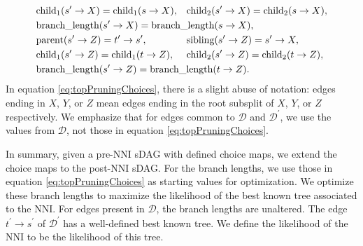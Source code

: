 \documentclass{article}
\begin{document}
\begin{align}
&\text{child}_1 (s^\prime\rightarrow X) = \text{child}_1(s \rightarrow X),&
&\text{child}_2 (s^\prime\rightarrow X) = \text{child}_2(s \rightarrow X),\\\nonumber
&\text{branch\_length} (s^\prime\rightarrow X) = \text{branch\_length}(s \rightarrow X),\hspace{-10em}&&\\\nonumber
&\text{parent} (s^\prime\rightarrow Z) = t^\prime \rightarrow s^\prime,&
&\text{sibling} (s^\prime\rightarrow Z) = s^\prime \rightarrow X,\\\nonumber 
&\text{child}_1 (s^\prime\rightarrow Z) = \text{child}_1(t \rightarrow Z),&
&\text{child}_2 (s^\prime\rightarrow Z) = \text{child}_2(t \rightarrow Z),\\\nonumber
&\text{branch\_length} (s^\prime\rightarrow Z) = \text{branch\_length}(t\rightarrow Z).\hspace{-10em}&&
\end{align}
In equation \eqref{eq:topPruningChoices}, there is a slight abuse of notation: edges ending in $X$, $Y$, or $Z$
mean edges ending in the root subsplit of $X$, $Y$, or $Z$ respectively.
We emphasize that for edges common to $\mathcal{D}$ and $\mathcal{D}^\prime$, we use the values
from $\mathcal{D}$, not those in equation \eqref{eq:topPruningChoices}.

In summary, given a pre-NNI sDAG with defined choice maps, we extend the choice maps to the post-NNI sDAG.
For the branch lengths, we use those in equation \eqref{eq:topPruningChoices} as starting values for optimization. 
We optimize these branch lengths to maximize the likelihood of the best known tree associated to the NNI.
For edges present in $\mathcal{D}$, the branch lengths are unaltered.
The edge $t^\prime\rightarrow s^\prime$ of $\mathcal{D}^\prime$ has a well-defined best known tree.
We define the likelihood of the NNI to be the likelihood of this tree. 
\end{document}
